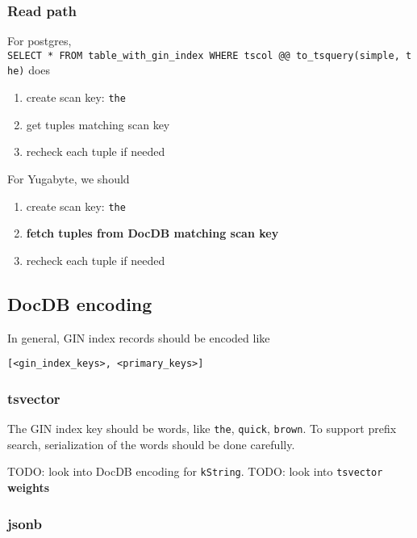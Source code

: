 \documentclass[
]{article}
\providecommand{\tightlist}{%
  \setlength{\itemsep}{0pt}\setlength{\parskip}{0pt}}
\begin{document}
\hypertarget{read-path}{%
\subsubsection{Read path}\label{read-path}}

For postgres,
\texttt{SELECT\ *\ FROM\ table\_with\_gin\_index\ WHERE\ tscol\ @@\ to\_tsquery(\textquotesingle{}simple\textquotesingle{},\ \textquotesingle{}the\textquotesingle{})}
does

\begin{enumerate}
\def\labelenumi{\arabic{enumi}.}
\tightlist
\item
  create scan key: \texttt{the}
\item
  get tuples matching scan key
\item
  recheck each tuple if needed
\end{enumerate}

For Yugabyte, we should

\begin{enumerate}
\def\labelenumi{\arabic{enumi}.}
\tightlist
\item
  create scan key: \texttt{the}
\item
  \textbf{fetch tuples from DocDB matching scan key}
\item
  recheck each tuple if needed
\end{enumerate}

\hypertarget{docdb-encoding}{%
\subsection{DocDB encoding}\label{docdb-encoding}}

In general, GIN index records should be encoded like

\texttt{{[}\textless{}gin\_index\_keys\textgreater{},\ \textless{}primary\_keys\textgreater{}{]}}

\hypertarget{tsvector}{%
\subsubsection{tsvector}\label{tsvector}}

The GIN index key should be words, like \texttt{the}, \texttt{quick},
\texttt{brown}. To support prefix search, serialization of the words
should be done carefully.

TODO: look into DocDB encoding for \texttt{kString}. TODO: look into
\texttt{tsvector} \textbf{weights}

\hypertarget{jsonb}{%
\subsubsection{jsonb}\label{jsonb}}
\end{document}
